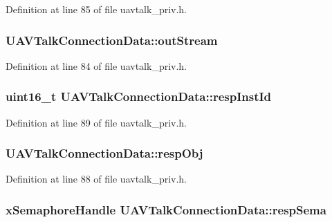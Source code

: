 \-Definition at line 85 of file uavtalk\-\_\-priv.\-h.

\hypertarget{struct_u_a_v_talk_connection_data_a9fbab27aee45e892087f580683fcec5f}{
\subsubsection[{out\-Stream}]{ {\bf \-U\-A\-V\-Talk\-Connection\-Data\-::out\-Stream}}}\label{struct_u_a_v_talk_connection_data_a9fbab27aee45e892087f580683fcec5f}


\-Definition at line 84 of file uavtalk\-\_\-priv.\-h.

\hypertarget{struct_u_a_v_talk_connection_data_a88e0af1586f91007f920afeb962b759f}{
\subsubsection[{resp\-Inst\-Id}]{\setlength{\rightskip}{0pt plus 5cm}uint16\-\_\-t {\bf \-U\-A\-V\-Talk\-Connection\-Data\-::resp\-Inst\-Id}}}\label{struct_u_a_v_talk_connection_data_a88e0af1586f91007f920afeb962b759f}


\-Definition at line 89 of file uavtalk\-\_\-priv.\-h.

\hypertarget{struct_u_a_v_talk_connection_data_af0a71495a3337b87b43dcfdda5424ade}{
\subsubsection[{resp\-Obj}]{ {\bf \-U\-A\-V\-Talk\-Connection\-Data\-::resp\-Obj}}}\label{struct_u_a_v_talk_connection_data_af0a71495a3337b87b43dcfdda5424ade}


\-Definition at line 88 of file uavtalk\-\_\-priv.\-h.

\hypertarget{struct_u_a_v_talk_connection_data_a8ae2519b555461363d46f9b27a80d051}{
\subsubsection[{resp\-Sema}]{\setlength{\rightskip}{0pt plus 5cm}x\-Semaphore\-Handle {\bf \-U\-A\-V\-Talk\-Connection\-Data\-::resp\-Sema}}}\label{struct_u_a_v_talk_connection_data_a8ae2519b555461363d46f9b27a80d051}


